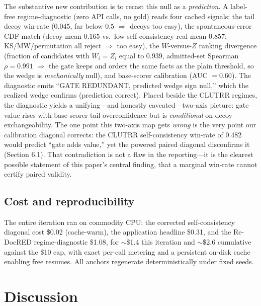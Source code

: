 \documentclass[11pt,letterpaper]{article}
\begin{document}
The substantive new contribution is to recast this null as a \emph{prediction}. A label-free regime-diagnostic (zero API calls, no gold) reads four cached signals: the tail decoy win-rate ($0.045$, far below $0.5$ $\Rightarrow$ decoys too easy), the spontaneous-error CDF match (decoy mean $0.165$ vs.\ low-self-consistency real mean $0.857$; KS/MW/permutation all reject $\Rightarrow$ too easy), the $W$-versus-$Z$ ranking divergence (fraction of candidates with $W_i=Z_i$ equal to $0.939$, admitted-set Spearman $\rho=0.991$ $\Rightarrow$ the gate keeps and orders the same facts as the plain threshold, so the wedge is \emph{mechanically} null), and base-scorer calibration (AUC $=0.60$). The diagnostic emits ``GATE REDUNDANT, predicted wedge sign null,'' which the realized wedge confirms (prediction correct). Placed beside the CLUTRR regimes, the diagnostic yields a unifying---and honestly caveated---two-axis picture: gate value rises with base-scorer tail-overconfidence but is \emph{conditional} on decoy exchangeability. The one point this two-axis map gets \emph{wrong} is the very point our calibration diagonal corrects: the CLUTRR self-consistency win-rate of $0.482$ would predict ``gate adds value,'' yet the powered paired diagonal disconfirms it (Section 6.1). That contradiction is not a flaw in the reporting---it is the clearest possible statement of this paper's central finding, that a marginal win-rate cannot certify paired validity.

\subsection{Cost and reproducibility}

The entire iteration ran on commodity CPU: the corrected self-consistency diagonal cost \$0.02 (cache-warm), the application headline \$0.31, and the Re-DocRED regime-diagnostic \$1.08, for $\sim$\$1.4 this iteration and $\sim$\$2.6 cumulative against the \$10 cap, with exact per-call metering and a persistent on-disk cache enabling free resumes. All anchors regenerate deterministically under fixed seeds.

\section{Discussion}
\end{document}
